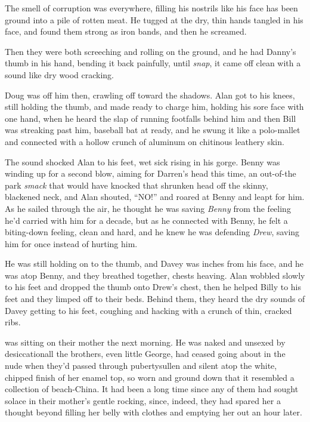 The smell of corruption was everywhere, filling his nostrils like his
face has been ground into a pile of rotten meat.  He tugged at the
dry, thin hands tangled in his face, and found them strong as iron
bands, and then he screamed.

Then they were both screeching and rolling on the ground, and he had
Danny's thumb in his hand, bending it back painfully, until
\textit{snap}, it came off clean with a sound like dry wood cracking.

Doug was off him then, crawling off toward the shadows.  Alan got to
his knees, still holding the thumb, and made ready to charge him,
holding his sore face with one hand, when he heard the slap of running
footfalls behind him and then Bill was streaking past him, baseball
bat at ready, and he swung it like a polo-mallet and connected with a
hollow crunch of aluminum on chitinous leathery skin.

The sound shocked Alan to his feet, wet sick rising in his gorge. 
Benny was winding up for a second blow, aiming for Darren's head this
time, an out-of-the park \textit{smack} that would have knocked that
shrunken head off the skinny, blackened neck, and Alan shouted,
``NO!'' and roared at Benny and leapt for him.  As he sailed through
the air, he thought he was saving \textit{Benny} from the feeling he'd
carried with him for a decade, but as he connected with Benny, he felt
a biting-down feeling, clean and hard, and he knew he was defending
\textit{Drew}, saving him for once instead of hurting him.

He was still holding on to the thumb, and Davey was inches from his
face, and he was atop Benny, and they breathed together, chests
heaving.  Alan wobbled slowly to his feet and dropped the thumb onto
Drew's chest, then he helped Billy to his feet and they limped off to
their beds.  Behind them, they heard the dry sounds of Davey getting
to his feet, coughing and hacking with a crunch of thin, cracked ribs.

 was sitting on their mother the next morning.  He was naked and
unsexed by desiccation\dash{}all the brothers, even little George, had
ceased going about in the nude when they'd passed through
puberty\dash{}sullen and silent atop the white, chipped finish of her
enamel top, so worn and ground down that it resembled a collection of
beach-China.  It had been a long time since any of them had sought
solace in their mother's gentle rocking, since, indeed, they had
spared her a thought beyond filling her belly with clothes and
emptying her out an hour later.

